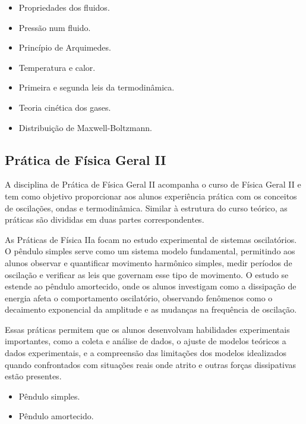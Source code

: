 \documentclass[a4paper, 12pt]{article}
\newcounter{fis}
\begin{document}
\begin{tcolorbox}[title=Ementa Física IIb:]
    \begin{itemize}
        \item Propriedades dos fluidos.
        \item Pressão num fluido.
        \item Princípio de Arquimedes.
        \item Temperatura e calor.
        \item Primeira e segunda leis da termodinâmica.
        \item Teoria cinética dos gases.
        \item Distribuição de Maxwell-Boltzmann.
    \end{itemize}
\end{tcolorbox}

\subsection{Prática de Física Geral II}
\label{fis005a}
\label{fis005b}

A disciplina de Prática de Física Geral II acompanha o curso de Física Geral II e tem
como objetivo proporcionar aos alunos experiência prática com os conceitos de
oscilações, ondas e termodinâmica. Similar à estrutura do curso teórico, as práticas
são divididas em duas partes correspondentes.

As Práticas de Física IIa focam no estudo experimental de sistemas oscilatórios. O
pêndulo simples serve como um sistema modelo fundamental, permitindo aos alunos
observar e quantificar movimento harmônico simples, medir períodos de oscilação e
verificar as leis que governam esse tipo de movimento. O estudo se estende ao pêndulo
amortecido, onde os alunos investigam como a dissipação de energia afeta o
comportamento oscilatório, observando fenômenos como o decaimento exponencial da
amplitude e as mudanças na frequência de oscilação.

Essas práticas permitem que os alunos desenvolvam habilidades experimentais importantes,
como a coleta e análise de dados, o ajuste de modelos teóricos a dados experimentais, e
a compreensão das limitações dos modelos idealizados quando confrontados com situações
reais onde atrito e outras forças dissipativas estão presentes.

\begin{tcolorbox}[title=Ementa Prática de Física IIa:]
    \begin{itemize}
        \item Pêndulo simples.
        \item Pêndulo amortecido.
    \end{itemize}
\end{tcolorbox}
\end{document}
